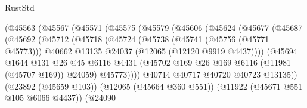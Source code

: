 \begin{lexlean}{RustStd}
\begin{coremodule}
                              (@45563
                                (@45567
                                  (@45571
                                    (@45575
                                      (@45579
                                        (@45606
                                          (@45624
                                            (@45677
                                              (@45687
                                                (@45692
                                                  (@45712
                                                    (@45718
                                                      (@45724
                                                        (@45738
                                                          (@45741 (@45756 (@45771 @45773)))
                                                          @40662
                                                          @13135
                                                          @24037
                                                          (@12065 (@12120 @9919 @4437))))
                                                      (@45694
                                                        @1644
                                                        @131
                                                        @26
                                                        @45
                                                        @6116
                                                        @4431
                                                        (@45702
                                                          @169
                                                          @26
                                                          @169
                                                          @6116
                                                          (@11981 (@45707 @169))
                                                          @24059)
                                                        @45773))))
                                                @40714
                                                @40717
                                                @40720
                                                @40723
                                                @13135))
                                            (@23892 (@45659 @103))
                                            (@12065 (@45664 @360 @551))
                                            (@11922 (@45671 @551 @105 @6066 @4437))
                                            (@24090

\end{coremodule}
\end{lexlean}
